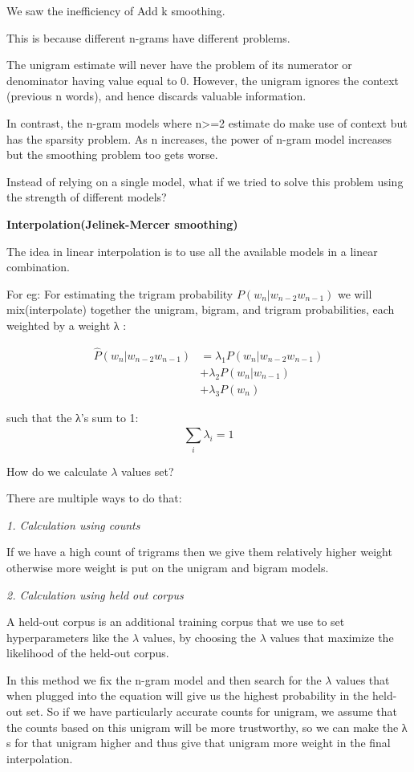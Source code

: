 \documentclass[11pt]{article}
\begin{document}
    We saw the inefficiency of Add k smoothing.

This is because different n-grams have different problems.

The unigram estimate will never have the problem of its numerator or
denominator having value equal to 0. However, the unigram ignores the
context (previous n words), and hence discards valuable information.

In contrast, the n-gram models where n\textgreater{}=2 estimate do make
use of context but has the sparsity problem. As n increases, the power
of n-gram model increases but the smoothing problem too gets worse.

Instead of relying on a single model, what if we tried to solve this
problem using the strength of different models?

\textbf{Interpolation(Jelinek-Mercer smoothing)}

The idea in linear interpolation is to use all the available models in a
linear combination.

For eg: For estimating the trigram probability
\(P(w_n |w_{n−2}w_{n−1})\) we will mix(interpolate) together the
unigram, bigram, and trigram probabilities, each weighted by a weight λ
:

\begin{align} \hat{P}(w_n | w_{n−2}w_{n−1}) &= \lambda_1 P(w_n | w_{n−2} w_{n−1}) \\
&+ \lambda_2 P(w_n | w_{n−1}) \\
&+ \lambda_3 P(w_n) \end{align}

such that the λ's sum to 1: \[\sum_{i}^{} \lambda_i = 1\]

How do we calculate \(\lambda\) values set?

There are multiple ways to do that:

\emph{1. Calculation using counts}

If we have a high count of trigrams then we give them relatively higher
weight otherwise more weight is put on the unigram and bigram models.

\emph{2. Calculation using held out corpus}

A held-out corpus is an additional training corpus that we use to set
hyperparameters like the \(\lambda\) values, by choosing the \(\lambda\)
values that maximize the likelihood of the held-out corpus.

In this method we fix the n-gram model and then search for the
\(\lambda\) values that when plugged into the equation will give us the
highest probability in the held-out set. So if we have particularly
accurate counts for unigram, we assume that the counts based on this
unigram will be more trustworthy, so we can make the λ s for that
unigram higher and thus give that unigram more weight in the final
interpolation.
\end{document}
